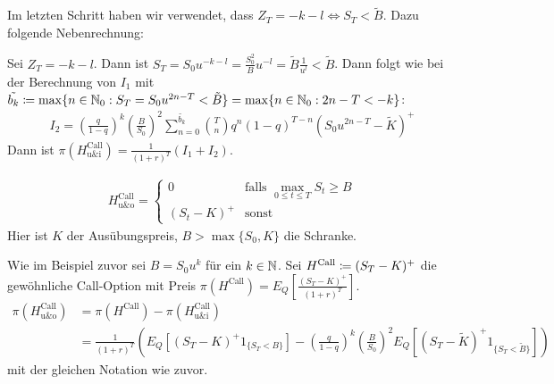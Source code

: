 \documentclass[a4paper,twoside,DIV15,BCOR12mm]{scrbook}
\begin{document}
\begin{beispiel}
Im letzten Schritt haben wir verwendet, dass $Z_T=-k-l\iff S_T<\tilde{B}$. Dazu folgende Nebenrechnung:

Sei $Z_T=-k-l$. Dann ist $S_T=S_0u^{-k-l}=\frac{S_0^2}{B}u^{-l}=\tilde{B}\frac{1}{u^l}<\tilde{B}$.  Dann folgt wie bei der Berechnung von $I_1$ mit $\tilde{b_k}\da\max\{n\in\MdN_0:S_T=S_0u^{2n-T}<\tilde{B}\}=\max\{n\in\MdN_0:2n-T<-k\}$:
\begin{align*}
I_2=\left(\frac{q}{1-q}\right)^k\left(\frac{B}{S_0}\right)^2 \sum\limits_{n=0}^{\tilde{b_k}} {T\choose n} q^n(1-q)^{T-n} (S_0u^{2n-T}-\tilde{K})^+
\end{align*}
Dann ist $\pi(H_{\text{u\&i}}^{\text{Call}})=\frac{1}{(1+r)^T}(I_1+I_2)$.
\end{beispiel}

\begin{beispiel}
\begin{align*}
H_{\text{u\&o}}^{\text{Call}} = 
\begin{cases}
0 & \text{falls }\max_{0\le t\le T}S_t \ge B \\
(S_t-K)^+ & \text{sonst}
\end{cases}
\end{align*}
Hier ist $K$ der Ausübungspreis, $B>\max\{S_0,K\}$ die Schranke.

Wie im Beispiel zuvor sei $B=S_0u^k$ für ein $k\in\mathbb{N}$.
Sei $H^{\text{Call}}\da(S_T-K)^+$ die gewöhnliche Call-Option mit Preis $\pi(H^{\text{Call}})=E_Q\left[\frac{(S_T-K)^+}{(1+r)^T}\right]$.
\begin{align*}
\pi(H_{\text{u\&o}}^{\text{Call}})&=\pi(H^{\text{Call}})-\pi(H_{\text{u\&i}}^{\text{Call}})\\
&=\frac{1}{(1+r)^T}(E_Q[(S_T-K)^+1_{\{S_T<B\}}]-\left(\frac{q}{1-q}\right)^k\left(\frac{B}{S_0}\right)^2E_Q[(S_T-\tilde{K})^+1_{\{S_T<\tilde{B}\}}])
\end{align*}
mit der gleichen Notation wie zuvor.
\end{beispiel}
\end{document}
